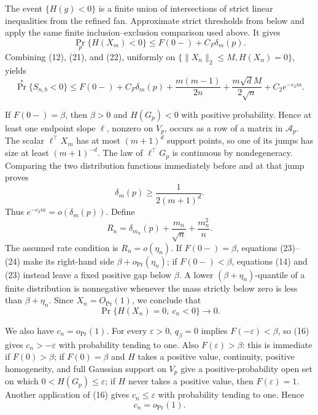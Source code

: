 The event \(\{H(g)<0\}\) is a finite union of intersections of strict linear inequalities from the refined fan.  Approximate strict thresholds from below and apply the same finite inclusion--exclusion comparison used above.  It gives
\[
\Pr_p\{H(X_m)<0\}\leq F(0-)+C_F\delta_m(p).
\tag{22}
\]
Combining (12), (21), and (22), uniformly on \(\{\|X_n\|_2\leq M,H(X_n)=0\}\), yields
\[
\Pr^*\{S_{n,b}<0\}
\leq F(0-)+C_F\delta_m(p)
+\frac{m(m-1)}{2n}+\frac{m\sqrt d M}{2\sqrt n}+C_2e^{-c_2m}.
\tag{23}
\]

If \(F(0-)=\beta\), then \(\beta>0\) and \(H(G_p)<0\) with positive probability.  Hence at least one endpoint slope \(\ell\), nonzero on \(V_p\), occurs as a row of a matrix in \(\mathcal A_p\).  The scalar \(\ell^{\top}X_m\) has at most \((m+1)^d\) support points, so one of its jumps has size at least \((m+1)^{-d}\).  The law of \(\ell^{\top}G_p\) is continuous by nondegeneracy.  Comparing the two distribution functions immediately before and at that jump proves
\[
\delta_m(p)\geq\frac{1}{2(m+1)^d}.
\tag{24}
\]
Thus \(e^{-c_2m}=o(\delta_m(p))\).  Define
\[
R_n=\delta_{m_n}(p)+\frac{m_n}{\sqrt n}+\frac{m_n^2}{n}.
\]
The assumed rate condition is \(R_n=o(\eta_n)\).  If \(F(0-)=\beta\), equations (23)--(24) make its right-hand side \(\beta+o_{\Pr}(\eta_n)\); if \(F(0-)<\beta\), equations (14) and (23) instead leave a fixed positive gap below \(\beta\).  A lower \((\beta+\eta_n)\)-quantile of a finite distribution is nonnegative whenever the mass strictly below zero is less than \(\beta+\eta_n\).  Since \(X_n=O_{\Pr}(1)\), we conclude that
\[
\Pr\{H(X_n)=0,\ c_n<0\}\longrightarrow0.
\tag{25}
\]

We also have \(c_n=o_{\Pr}(1)\).  For every \(\varepsilon>0\), \(q_\beta=0\) implies \(F(-\varepsilon)<\beta\), so (16) gives \(c_n>-\varepsilon\) with probability tending to one.  Also \(F(\varepsilon)>\beta\): this is immediate if \(F(0)>\beta\); if \(F(0)=\beta\) and \(H\) takes a positive value, continuity, positive homogeneity, and full Gaussian support on \(V_p\) give a positive-probability open set on which \(0<H(G_p)\leq\varepsilon\); if \(H\) never takes a positive value, then \(F(\varepsilon)=1\).  Another application of (16) gives \(c_n\leq\varepsilon\) with probability tending to one.  Hence
\[
c_n=o_{\Pr}(1).
\tag{26}
\]

